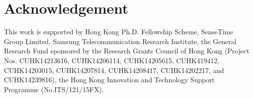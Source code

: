\documentclass[runningheads]{llncs}
\begin{document}
\section*{Acknowledgement}
This work is supported by Hong Kong Ph.D. Fellowship Scheme, SenseTime Group Limited, Samsung Telecommunication Research Institute, the General Research Fund sponsored by the Research Grants Council of Hong Kong (Project Nos. CUHK14213616, CUHK14206114, CUHK14205615, CUHK419412, CUHK14203015, CUHK14207814, CUHK14208417, CUHK14202217, and CUHK14239816), the Hong Kong Innovation and Technology Support Programme (No.ITS/121/15FX). 



\end{document}
